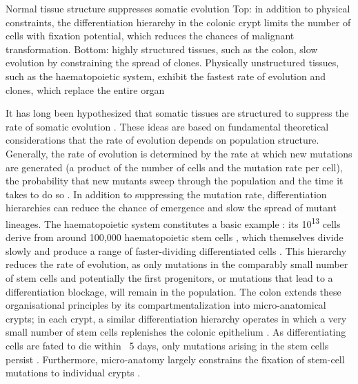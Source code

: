     {Normal tissue structure suppresses somatic evolution \parencite{Seferbekova2023-wg}}
    {Top: in addition to physical constraints, the differentiation hierarchy in the colonic crypt limits the number of cells with fixation potential, which reduces the chances of malignant transformation. Bottom: highly structured tissues, such as the colon, slow evolution by constraining the spread of clones. Physically unstructured tissues, such as the haematopoietic system, exhibit the fastest rate of evolution and clones, which replace the entire organ}

It has long been hypothesized that somatic tissues are structured to suppress the rate of somatic evolution \parencite{Cairns1975-oz}. These ideas are based on fundamental theoretical considerations that the rate of evolution depends on population structure. Generally, the rate of evolution is determined by the rate at which new mutations are generated (a product of the number of cells and the mutation rate per cell), the probability that new mutants sweep through the population \parencite{Lieberman2005-cy} and the time it takes to do so \parencite{Frean2013-rq,Tkadlec2019-cp}. In addition to suppressing the mutation rate, differentiation hierarchies can reduce the chance of emergence and slow the spread of mutant lineages. The haematopoietic system constitutes a basic example \parencite{Lopes2007-je}: its 10\textsuperscript{13} cells derive from around 100,000 haematopoietic stem cells \parencite{Lee-Six2018-pn,Sender2016-og}, which themselves divide slowly and produce a range of faster-dividing differentiated cells \parencite{Humphries2008-jj}. This hierarchy reduces the rate of evolution, as only mutations in the comparably small number of stem cells and potentially the first progenitors, or mutations that lead to a differentiation blockage, will remain in the population. The colon extends these organisational principles by its compartmentalization into micro-anatomical crypts; in each crypt, a similar differentiation hierarchy operates in which a very small number of stem cells replenishes the colonic epithelium \parencite{Humphries2008-jj}. As differentiating cells are fated to die within ~5 days, only mutations arising in the stem cells persist \parencite{Cairns1975-oz,Nowak2003-pq,Sender2021-ow}. Furthermore, micro-anatomy largely constrains the fixation of stem-cell mutations to individual crypts .

